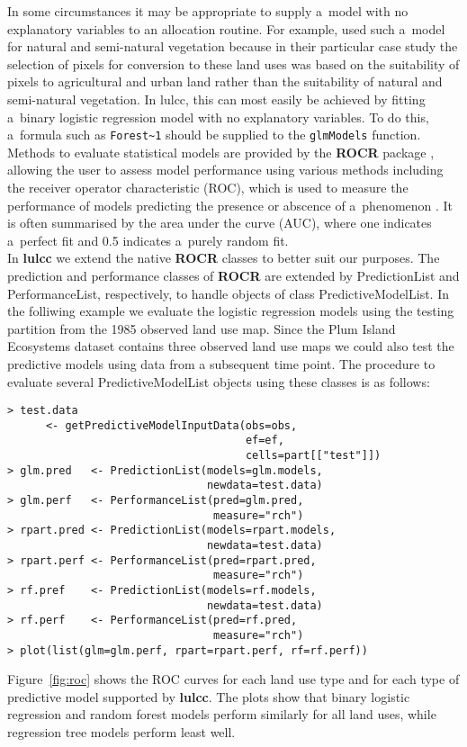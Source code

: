 \documentclass[gmdd, online, hvmath]{copernicus}
\begin{document}
In some circumstances it may be appropriate to supply a~model with no explanatory variables to an allocation routine. For example, \citet{verburg2009} used such a~model for natural and semi-natural vegetation because in their particular case study the selection of pixels for conversion to these land uses was based on the suitability of pixels to agricultural and urban land rather than the suitability of natural and semi-natural vegetation. In lulcc, this can most easily be achieved by fitting a~binary logistic regression model with no explanatory variables. To do this, a~formula such as \texttt{Forest\textasciitilde1} should be supplied to the \texttt{glmModels} function. \\

Methods to evaluate statistical models are provided by the \textbf{ROCR} package \citep{sing2005}, allowing the user to assess model performance using various methods including the receiver operator characteristic (ROC), which is used to measure the performance of models predicting the presence or abscence of a~phenomenon \citep{pontius2014}. It is often summarised by the area under the curve (AUC), where one indicates a~perfect fit and 0.5 indicates a~purely random fit. \\

In \textbf{lulcc} we extend the native \textbf{ROCR} classes to better suit our purposes. The prediction and performance classes of \textbf{ROCR} are extended by PredictionList and PerformanceList, respectively, to handle objects of class PredictiveModelList. In the folliwing example we evaluate the logistic regression models using the testing partition from the 1985 observed land use map. Since the Plum Island Ecosystems dataset contains three observed land use maps we could also test the predictive models using data from a subsequent time point. The procedure to evaluate several PredictiveModelList objects using these classes is as follows:
\begin{verbatim}
> test.data  
      <- getPredictiveModelInputData(obs=obs, 
                                     ef=ef, 
                                     cells=part[["test"]]) 
> glm.pred   <- PredictionList(models=glm.models, 
                               newdata=test.data) 
> glm.perf   <- PerformanceList(pred=glm.pred, 
                                measure="rch") 
> rpart.pred <- PredictionList(models=rpart.models, 
                               newdata=test.data) 
> rpart.perf <- PerformanceList(pred=rpart.pred, 
                                measure="rch") 
> rf.pref    <- PredictionList(models=rf.models, 
                               newdata=test.data) 
> rf.perf    <- PerformanceList(pred=rf.pred, 
                                measure="rch") 
> plot(list(glm=glm.perf, rpart=rpart.perf, rf=rf.perf)) 
\end{verbatim}\hack{\noindent}Figure~\ref{fig:roc} shows the ROC curves for each land use type and for each type of predictive model supported by \textbf{lulcc}. The plots show that binary logistic regression and random forest models perform similarly for all land uses, while regression tree models perform least well. \\
\end{document}
